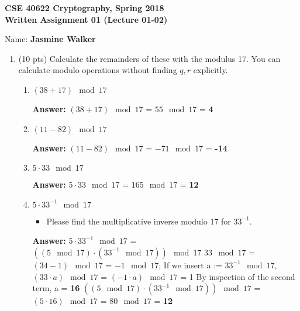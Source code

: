 \documentclass[10pt]{article}
\begin{document}






\begin{center}
	\textbf{CSE 40622 Cryptography, Spring 2018\\Written Assignment 01 (Lecture 01-02)}
\end{center}


Name: \textbf{Jasmine Walker}


\begin{enumerate}
	\item (10 pts) Calculate the remainders of these with the modulus 17. You can calculate modulo operations without finding $q,r$ explicitly.
	\begin{enumerate}
		\item $(38+17)\mod 17$
		
		\textbf{Answer:} \newline $(38+17)\mod 17$ = $55\mod 17$ = \textbf{4} \newline
		\item $(11-82)\mod 17$
		
		\textbf{Answer:} \newline $(11-82)\mod 17$ = $-71\mod 17$ = \textbf{-14} \newline
		\item $5\cdot 33\mod 17$
		
		\textbf{Answer:} \newline $5\cdot 33\mod 17$ = $165\mod 17$ = \textbf{12} \newline
		\item $5\cdot 33^{-1}\mod 17$
		

		\begin{itemize}
			\item Please find the multiplicative inverse modulo 17 for $33^{-1}$.
		\end{itemize}
		\textbf{Answer:} \newline $5\cdot 33^{-1}\mod 17$ = $((5\mod 17)\cdot (33^{-1}\mod 17))\mod 17$ \newline  $33\mod 17$ = $(34 - 1)\mod 17$ = $-1\mod 17$; \newline If we insert a := $33^{-1}\mod 17$, $(33\cdot a)\mod 17$ = $(-1\cdot a)\mod 17$ = 1 \newline By inspection of the second term, a = \textbf{16} \newline $((5\mod 17)\cdot (33^{-1}\mod 17))\mod 17$ = $(5\cdot 16)\mod 17$ = $80\mod 17$ = \textbf{12} \newline
		

\end{enumerate}
\end{enumerate}
\end{document}
